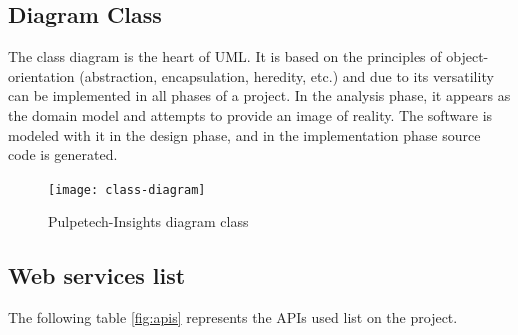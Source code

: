 \subsection{Diagram Class}
The class diagram is the heart of UML. It is based on the principles of object-orientation (abstraction, encapsulation, heredity, etc.) and due to its versatility can be implemented in all phases of a project. In the analysis phase, it appears as the domain model and attempts to provide an image of reality. The software is modeled with it in the design phase, and in the implementation phase source code is generated.
\begin{figure}[!htbp]
\center
\hspace*{-0.5in}
\texttt{[image: class-diagram]}
  \caption{Pulpetech-Insights diagram class}
  \label{fig:diagram_class}
\end{figure}

%
%
%
\subsection{Web services list}

The following table  \hyperref[fig:apis]{\ref{fig:apis}} represents the APIs used list on the project.

